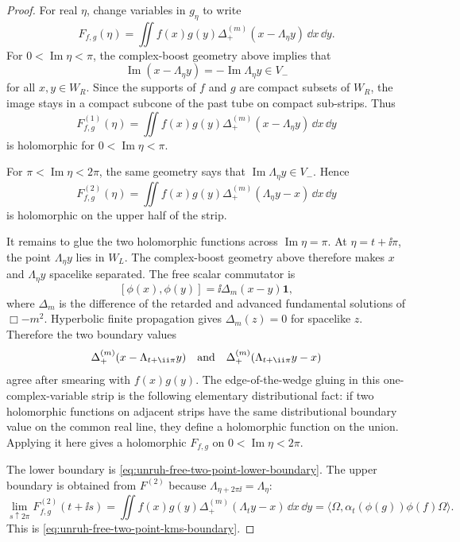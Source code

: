 \begin{proof}
For real \(\eta\), change variables in \(g_\eta\) to write
\begin{equation}
  F_{f,g}(\eta)
  =
  \iint f(x)g(y)\Delta_+^{(m)}(x-\Lambda_\eta y)\,\dd x\,\dd y .
  \label{eq:unruh-free-two-point-lower-boundary}
\end{equation}
For \(0<\operatorname{Im}\eta<\pi\), the complex-boost geometry above implies
that
\[
  \operatorname{Im}(x-\Lambda_\eta y)
  =
  -\operatorname{Im}\Lambda_\eta y
  \in V_-
\]
for all \(x,y\in W_R\).  Since the supports of \(f\) and \(g\) are compact
subsets of \(W_R\), the image stays in a compact subcone of the past tube on
compact sub-strips.  Thus
\[
  F^{(1)}_{f,g}(\eta)
  =
  \iint f(x)g(y)\Delta_+^{(m)}(x-\Lambda_\eta y)\,\dd x\,\dd y
\]
is holomorphic for \(0<\operatorname{Im}\eta<\pi\).

For \(\pi<\operatorname{Im}\eta<2\pi\), the same geometry says that
\(\operatorname{Im}\Lambda_\eta y\in V_-\).  Hence
\[
  F^{(2)}_{f,g}(\eta)
  =
  \iint f(x)g(y)\Delta_+^{(m)}(\Lambda_\eta y-x)\,\dd x\,\dd y
\]
is holomorphic on the upper half of the strip.

It remains to glue the two holomorphic functions across
\(\operatorname{Im}\eta=\pi\).  At \(\eta=t+\ii\pi\), the point
\(\Lambda_\eta y\) lies in \(W_L\).  The complex-boost geometry above
therefore makes \(x\) and \(\Lambda_\eta y\) spacelike separated.  The free
scalar commutator is
\[
  [\phi(x),\phi(y)]=\ii\Delta_m(x-y)\mathbf 1,
\]
where \(\Delta_m\) is the difference of the retarded and advanced
fundamental solutions of \(\Box-m^2\).  Hyperbolic finite propagation gives
\(\Delta_m(z)=0\) for spacelike \(z\).  Therefore the two boundary values
\[
  \Delta_+^{(m)}(x-\Lambda_{t+\ii\pi}y)
  \quad\hbox{and}\quad
  \Delta_+^{(m)}(\Lambda_{t+\ii\pi}y-x)
\]
agree after smearing with \(f(x)g(y)\).  The edge-of-the-wedge gluing in this
one-complex-variable strip is the following elementary distributional fact:
if two holomorphic functions on adjacent strips have the same distributional
boundary value on the common real line, they define a holomorphic function on
the union.  Applying it here gives a holomorphic \(F_{f,g}\) on
\(0<\operatorname{Im}\eta<2\pi\).

The lower boundary is
\eqref{eq:unruh-free-two-point-lower-boundary}.  The upper boundary is
obtained from \(F^{(2)}\) because
\(\Lambda_{\eta+2\pi\ii}=\Lambda_\eta\):
\[
  \lim_{s\uparrow2\pi}F^{(2)}_{f,g}(t+\ii s)
  =
  \iint f(x)g(y)\Delta_+^{(m)}(\Lambda_t y-x)\,\dd x\,\dd y
  =
  \langle\Omega,\alpha_t(\phi(g))\phi(f)\Omega\rangle .
\]
This is \eqref{eq:unruh-free-two-point-kms-boundary}.
\end{proof}

